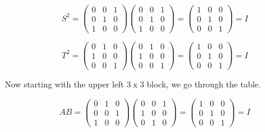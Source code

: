 \documentclass[12pt]{article}
\begin{document}
\begin{displaymath}
S^2=\left( \begin{array}{ccc}
0 & 0 & 1 \\
0 & 1 & 0\\
1 & 0 & 0
\end{array} \right )
\left( \begin{array}{ccc}
0 & 0 & 1 \\
0 & 1 & 0\\
1 & 0 & 0
\end{array} \right )=
\left( \begin{array}{ccc}
1 & 0 & 0 \\
0 & 1 & 0\\
0 & 0 & 1
\end{array} \right )=I
\end{displaymath}

\begin{displaymath}
T^2=\left( \begin{array}{ccc}
0 & 1 & 0 \\
1 & 0 & 0\\
0 & 0 & 1
\end{array} \right )
\left( \begin{array}{ccc}
0 & 1 & 0 \\
1 & 0 & 0\\
0 & 0 & 1
\end{array} \right )=
\left( \begin{array}{ccc}
1 & 0 & 0 \\
0 & 1 & 0\\
0 & 0 & 1
\end{array} \right )=I
\end{displaymath}

Now starting with the upper left $3\operatorname{x}3$ block, we go through the table.

\begin{displaymath}
AB=\left( \begin{array}{ccc}
0 & 1 & 0 \\
0 & 0 & 1\\
1 & 0 & 0
\end{array} \right )
\left( \begin{array}{ccc}
0 & 0 & 1 \\
1 & 0 & 0\\
0 & 1 & 0
\end{array} \right )=
\left( \begin{array}{ccc}
1 & 0 & 0 \\
0 & 1 & 0\\
0 & 0 & 1
\end{array} \right )=I
\end{displaymath}
\end{document}
